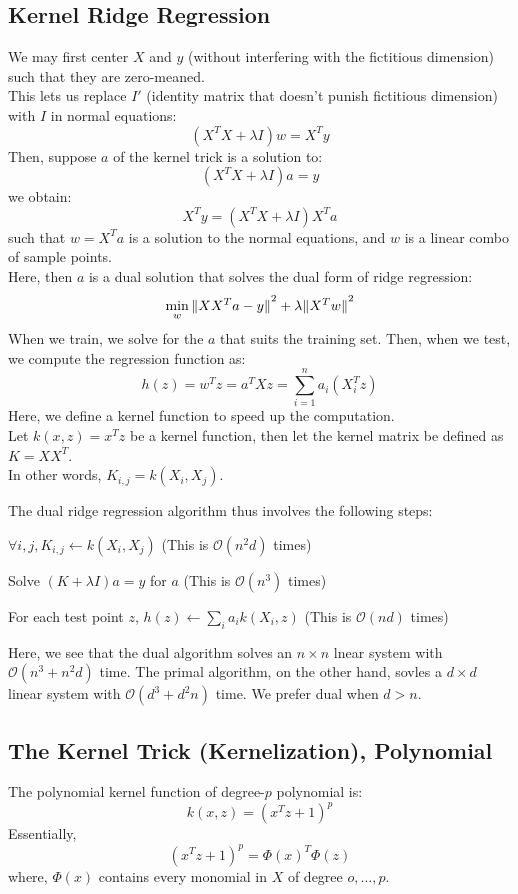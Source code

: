 \subsection{Kernel Ridge Regression}
We may first center $X$ and $y$ (without interfering with the fictitious dimension) such that they are zero-meaned. \\
This lets us replace $I'$ (identity matrix that doesn't punish fictitious dimension) with $I$ in normal equations:
\[
    (X^T X + \lambda I) w = X^T y
\]
Then, suppose $a$ of the kernel trick is a solution to:
\[
    (X^T X + \lambda I) a = y
\]
we obtain:
\[
    X^T y = (X^T X + \lambda I) X^T a
\]
such that $w = X^T a$ is a solution to the normal equations, and $w$ is a linear combo of sample points. \\
Here, then $a$ is a dual solution that solves the dual form of ridge regression:
\[
    \min_w \pnorm[2]{X X^T a - y}{} + \lambda \pnorm[2]{X^T w}{}
\]
When we train, we solve for the $a$ that suits the training set.
Then, when we test, we compute the regression function as:
\[
    h(z) = w^T z = a^T X z = \sum_{i = 1}^n a_i (X_i^T z)
\]
Here, we define a kernel function to speed up the computation. \\
Let $k(x, z) = x^T z$ be a kernel function, then let the kernel matrix be defined as $K = X X^T$. \\
In other words, $K_{i,j} = k(X_i, X_j)$.

The dual ridge regression algorithm thus involves the following steps:
\begin{bindenum}
    \item $\forall i, j, K_{i,j} \leftarrow k(X_i, X_j)$ (This is $\mathcal{O}(n^2 d)$ times)
    \item Solve $(K + \lambda I)a = y$ for $a$ (This is $\mathcal{O}(n^3)$ times)
    \item For each test point $z$, $h(z) \leftarrow \sum_i a_i k(X_i, z)$ (This is $\mathcal{O}(n d)$ times)
\end{bindenum}
Here, we see that the dual algorithm solves an $n \times n$ lnear system with $\mathcal{O} (n^3 + n^2 d)$ time.
The primal algorithm, on the other hand, sovles a $d \times d$ linear system with $\mathcal{O} (d^3 + d^2 n)$ time.
We prefer dual when $d > n$.

\subsection{The Kernel Trick (Kernelization), Polynomial}
The polynomial kernel function of degree-$p$ polynomial is:
\[
    k(x, z) = {(x^T z + 1)}^p
\]
Essentially,
\[
    {(x^T z + 1)}^p = {\Phi(x)}^T \Phi(z)
\]
where, $\Phi(x)$ contains every monomial in $X$ of degree $o, \dots, p$.

